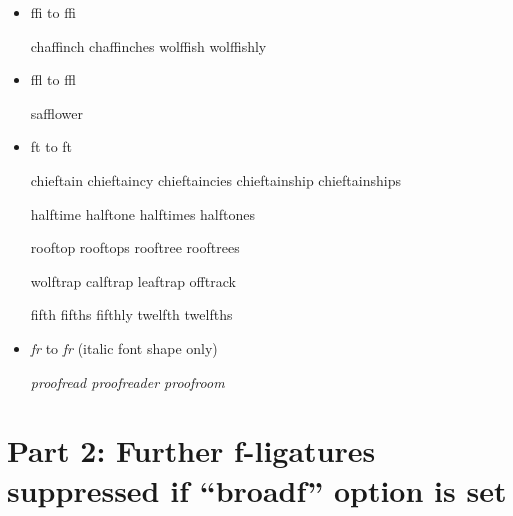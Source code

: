 \begin{itemize}
\item ffi to f\hspace{0pt}fi

chaffinch chaffinches wolffish wolffishly

\item ffl to f\hspace{0pt}fl

safflower



\item ft to f\hspace{0pt}t

chieftain chieftaincy chieftaincies chieftainship chieftainships

halftime halftone halftimes halftones

rooftop rooftops rooftree rooftrees

wolftrap calftrap leaftrap offtrack

fifth fifths fifthly twelfth twelfths



\item \emph{fr} to \emph{f\hspace{0pt}r} (italic font shape only)

\emph{proofread proofreader proofroom}



\end{itemize}

\section*{Part 2: Further f-ligatures suppressed if ``broadf'' option is set}

